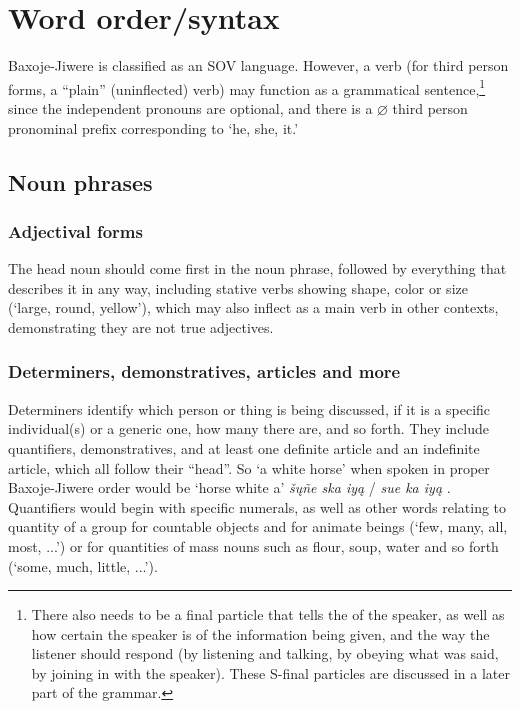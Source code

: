 \documentclass[output=paper]{LSP/langsci}
\begin{document}
\section{Word order/syntax}
Baxoje-Jiwere is classified as an SOV language.  However, a verb (for third person forms, a ``plain'' (uninflected) verb) may function as a grammatical sentence,\footnote{There also needs to be a final particle that tells the  of the speaker, as well as how certain the speaker is of the information being given, and the way the listener should respond (by listening and talking, by obeying what was said, by joining in with the speaker). These S-final particles are discussed in a later part of the grammar.} since the independent pronouns are optional, and there is a $\varnothing$ third person pronominal prefix corresponding to `he, she, it.'  	
			                      
\subsection{Noun phrases} 
	
\subsubsection{Adjectival forms}  The head noun should come first in the noun phrase, followed by everything that describes it in any way, including stative verbs showing shape, color or size (`large, round, yellow'), which may also inflect as a main verb in other contexts, demonstrating they are not true adjectives.  

\subsubsection{Determiners, demonstratives, articles and more}  Determiners identify which person or thing is being discussed, if it is a specific individual(s) or a generic one, how many there are, and so forth.  They include quantifiers, demonstratives, and at least one definite article and an indefinite article, which all follow their ``head''.  So `a white horse' when spoken in proper Baxoje-Jiwere order would be `horse white a' \textit{\v{s}\k{u}ñe ska iy\k{a}}  / \textit{sue ka iy\k{a}} .  Quantifiers would begin with specific numerals, as well as other words relating to quantity of a group for countable objects and for animate beings (`few, many, all, most, ...') or for quantities of mass nouns such as flour, soup, water and so forth (`some, much, little, ...').   
\end{document}

